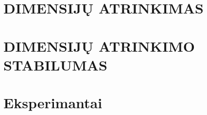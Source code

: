 \documentclass{article}
\begin{document}


\let \savenumberline \numberline
\def \numberline#1{\savenumberline{#1.}}
\tableofcontents 



\section{DIMENSIJŲ ATRINKIMAS}



\section{DIMENSIJŲ ATRINKIMO STABILUMAS}


\section{Eksperimantai}





\end{document}

